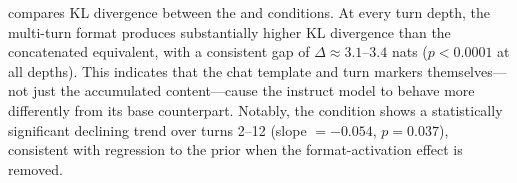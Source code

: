 \begin{table}[t]
\centering
\caption{KL divergence between \qweninst and \qwenbase output distributions at each conversation depth. Values are mean $\pm$ standard deviation across 24 measurements (8 probes $\times$ 3 topics). The two-phase pattern---increase then decrease---is visible in the KL divergence column.}
\label{tab:kl_by_turn}
\vspace{4pt}
\end{table}

 compares KL divergence between the \multiturn and \concat conditions. At every turn depth, the multi-turn format produces substantially higher KL divergence than the concatenated equivalent, with a consistent gap of $\Delta \approx 3.1$--$3.4$ nats ($p < 0.0001$ at all depths). This indicates that the chat template and turn markers themselves---not just the accumulated content---cause the instruct model to behave more differently from its base counterpart. Notably, the \concat condition shows a statistically significant declining trend over turns 2--12 (slope $= -0.054$, $p = 0.037$), consistent with regression to the prior when the format-activation effect is removed.

